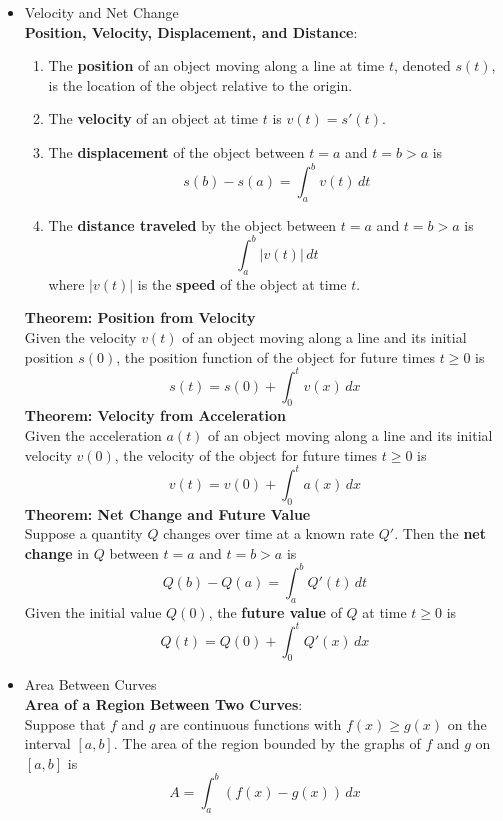 \documentclass{article}
\begin{document}
\begin{itemize}
    \item Velocity and Net Change \\
        \textbf{Position, Velocity, Displacement, and Distance}:
        \begin{enumerate}
            \item The \textbf{position} of an object moving along a line at time $t$, denoted $s(t)$, is the location of the object relative to the origin.
            \item The \textbf{velocity} of an object at time $t$ is $v(t) = s'(t)$.
            \item The \textbf{displacement} of the object between $t = a$ and $t = b > a$ is
                $$s(b) - s(a) = \int_a^b{v(t)\,dt}$$
            \item The \textbf{distance traveled} by the object between $t = a$ and $t = b > a$ is
                $$\int_a^b{\left|v(t)\right|\,dt}$$
                where $|v(t)|$ is the \textbf{speed} of the object at time $t$.
        \end{enumerate}
        \textbf{Theorem: Position from Velocity} \\
        Given the velocity $v(t)$ of an object moving along a line and its initial position $s(0)$, the position function of the object for future times $t \geq 0$ is
        $$s(t) = s(0) + \int_0^t{v(x)\,dx}$$
        \textbf{Theorem: Velocity from Acceleration} \\
        Given the acceleration $a(t)$ of an object moving along a line and its initial velocity $v(0)$, the velocity of the object for future times $t \geq 0$ is
        $$v(t) = v(0) + \int_0^t{a(x)\,dx}$$
        \textbf{Theorem: Net Change and Future Value} \\
        Suppose a quantity $Q$ changes over time at a known rate $Q'$. Then the \textbf{net change} in $Q$ between $t = a$ and $t = b > a$ is
        $$Q(b) - Q(a) = \int_a^b{Q'(t)\,dt}$$
        Given the initial value $Q(0)$, the \textbf{future value} of $Q$ at time $t \geq 0$ is
        $$Q(t) = Q(0) + \int_0^t{Q'(x)\,dx}$$
    \item Area Between Curves \\
        \textbf{Area of a Region Between Two Curves}: \\
        Suppose that $f$ and $g$ are continuous functions with $f(x) \geq g(x)$ on the interval $[a,b]$. The area of the region bounded by the graphs of $f$ and $g$ on $[a,b]$ is
        $$A = \int_a^b{\left(f(x) - g(x)\right)\,dx}$$
\end{itemize}
\end{document}
